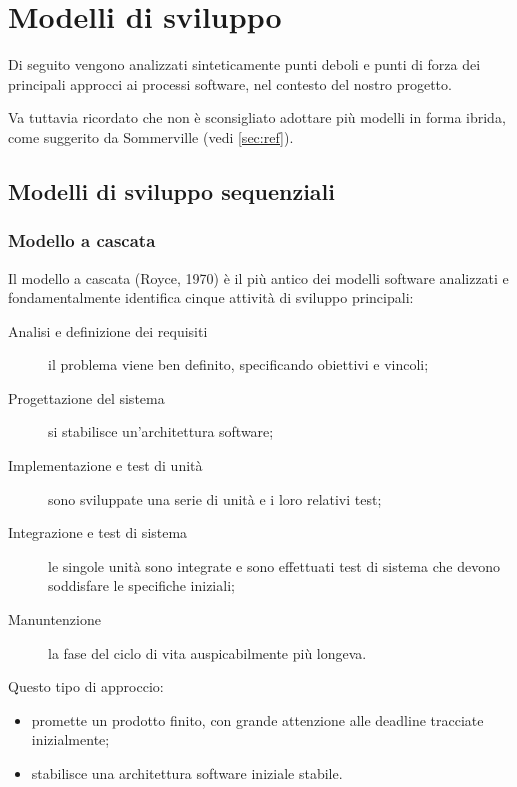 \appendix


\section{Modelli di sviluppo} \label{sec:modelli}

Di seguito vengono analizzati sinteticamente punti deboli e punti di forza dei principali approcci ai processi software, nel contesto del nostro progetto.

Va tuttavia ricordato che non è sconsigliato adottare più modelli in forma ibrida, come suggerito da Sommerville (vedi \ref{sec:ref}).

\subsection{Modelli di sviluppo sequenziali}

\subsubsection{Modello a cascata}
Il modello a cascata (Royce, 1970) è il più antico dei modelli software analizzati e fondamentalmente identifica cinque attività di sviluppo principali:
\begin{description}
	\item [Analisi e definizione dei requisiti] il problema viene ben definito, specificando obiettivi e vincoli;
	\item [Progettazione del sistema] si stabilisce un'architettura software;
	\item [Implementazione e test di unità] sono sviluppate una serie di unità e i loro relativi test;
	\item [Integrazione e test di sistema] le singole unità sono integrate e sono effettuati test di sistema che devono soddisfare le specifiche iniziali;
	\item [Manuntenzione] la fase del ciclo di vita auspicabilmente più longeva.
\end{description}

Questo tipo di approccio:
\begin{itemize}
	\item promette un prodotto finito, con grande attenzione alle deadline tracciate inizialmente;
	\item stabilisce una architettura software iniziale stabile.
\end{itemize}

